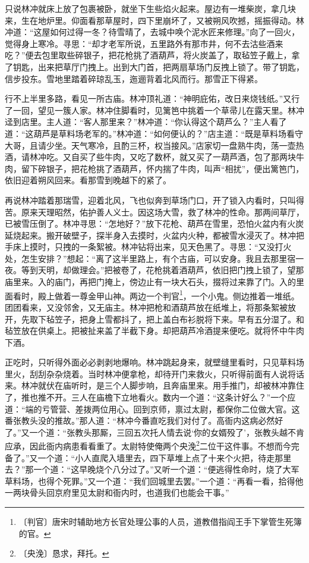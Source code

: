 \documentclass[12pt,UTF-8,openany]{ctexbook}
\begin{document}
\begin{normalsize}
    只说林冲就床上放了包裹被卧，就坐下生些焰火起来。屋边有一堆柴炭，拿几块来，生在地炉里。仰面看那草屋时，四下里崩坏了，又被朔风吹撼，摇振得动。林冲道：“这屋如何过得一冬？待雪晴了，去城中唤个泥水匠来修理。”向了一回火，觉得身上寒冷。寻思：“却才老军所说，五里路外有那市井，何不去沽些酒来吃？”便去包里取些碎银子，把花枪挑了酒葫芦，将火炭盖了，取毡笠子戴上，拿了钥匙，出来把草厅门拽上。出到大门首，把两扇草场门反拽上锁了。带了钥匙，信步投东。雪地里踏着碎琼乱玉，迤逦背着北风而行。那雪正下得紧。
    
    行不上半里多路，看见一所古庙。林冲顶礼道：“神明庇佑，改日来烧钱纸。”又行了一回，望见一簇人家。林冲住脚看时，见篱笆中挑着一个草帚儿在露天里。林冲迳到店里。主人道：“客人那里来？”林冲道：“你认得这个葫芦么？”主人看了道：“这葫芦是草料场老军的。”林冲道：“如何便认的？”店主道：“既是草料场看守大哥，且请少坐。天气寒冷，且酌三杯，权当接风。”店家切一盘熟牛肉，荡一壶热酒，请林冲吃。又自买了些牛肉，又吃了数杯，就又买了一葫芦酒，包了那两块牛肉，留下碎银子，把花枪挑了酒葫芦，怀内揣了牛肉，叫声“相扰”，便出篱笆门，依旧迎着朔风回来。看那雪到晚越下的紧了。
    
    再说林冲踏着那瑞雪，迎着北风，飞也似奔到草场门口，开了锁入内看时，只叫得苦。原来天理昭然，佑护善人义士。因这场大雪，救了林冲的性命。那两间草厅，已被雪压倒了。林冲寻思：“怎地好？”放下花枪、葫芦在雪里，恐怕火盆内有火炭延烧起来。搬开破壁子，探半身入去摸时，火盆内火种，都被雪水浸灭了。林冲把手床上摸时，只拽的一条絮被。林冲钻将出来，见天色黑了。寻思：“又没打火处，怎生安排？”想起：“离了这半里路上，有个古庙，可以安身。我且去那里宿一夜。等到天明，却做理会。”把被卷了，花枪挑着酒葫芦，依旧把门拽上锁了，望那庙里来。入的庙门，再把门掩上，傍边止有一块大石头，掇将过来靠了门。入的里面看时，殿上做着一尊金甲山神。两边一个判官\footnote{〔判官〕唐宋时辅助地方长官处理公事的人员，道教借指阎王手下掌管生死簿的官。}，一个小鬼。侧边推着一堆纸。团团看来，又没邻舍，又无庙主。林冲把枪和酒葫芦放在纸堆上，将那条絮被放开，先取下毡笠子，把身上雪都抖了，把上盖白布衫脱将下来。早有五分湿了。和毡笠放在供桌上。把被扯来盖了半截下身。却把葫芦冷酒提来便吃。就将怀中牛肉下酒。
    
    正吃时，只听得外面必必剥剥地爆响。林冲跳起身来，就壁缝里看时，只见草料场里火，刮刮杂杂烧着。当时林冲便拿枪，却待开门来救火，只听得前面有人说将话来。林冲就伏在庙听时，是三个人脚步响，且奔庙里来。用手推门，却被林冲靠住了，推也推不开。三人在庙檐下立地看火。数内一个道：“这条计好么？”一个应道：“端的亏管营、差拨两位用心。回到京师，禀过太尉，都保你二位做大官。这番张教头没的推故。”那人道：“林冲今番直吃我们对付了。高衙内这病必然好了。”又一个道：“张教头那厮，三回五次托人情去说‘你的女婿殁了’，张教头越不肯应承，因此衙内病患看看重了。太尉特使俺两个央浼\footnote{〔央浼〕恳求，拜托。}二位干这件事。不想而今完备了。”又一个道：“小人直爬入墙里去，四下草堆上点了十来个火把，待走那里去？”那一个道：“这早晚烧个八分过了。”又听一个道：“便逃得性命时，烧了大军草料场，也得个死罪。”又一个道：“我们回城里去罢。”一个道：“再看一看，拾得他一两块骨头回京府里见太尉和衙内时，也道我们也能会干事。”
    

\end{normalsize}
\end{document}

